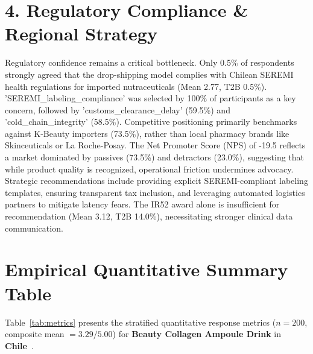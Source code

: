 \documentclass[10pt,twocolumn,a4paper]{article}
\begin{document}
\section{4. Regulatory Compliance \& Regional Strategy}
Regulatory confidence remains a critical bottleneck. Only 0.5\% of respondents strongly agreed that the drop-shipping model complies with Chilean SEREMI health regulations for imported nutraceuticals (Mean 2.77, T2B 0.5\%). 'SEREMI\_labeling\_compliance' was selected by 100\% of participants as a key concern, followed by 'customs\_clearance\_delay' (59.5\%) and 'cold\_chain\_integrity' (58.5\%). Competitive positioning primarily benchmarks against K-Beauty importers (73.5\%), rather than local pharmacy brands like Skinceuticals or La Roche-Posay. The Net Promoter Score (NPS) of -19.5 reflects a market dominated by passives (73.5\%) and detractors (23.0\%), suggesting that while product quality is recognized, operational friction undermines advocacy. Strategic recommendations include providing explicit SEREMI-compliant labeling templates, ensuring transparent tax inclusion, and leveraging automated logistics partners to mitigate latency fears. The IR52 award alone is insufficient for recommendation (Mean 3.12, T2B 14.0\%), necessitating stronger clinical data communication.


\section{Empirical Quantitative Summary Table}
Table~\ref{tab:metrics} presents the stratified quantitative response metrics ($n = 200$, composite mean $= 3.29/5.00$) for \textbf{Beauty Collagen Ampoule Drink} in \textbf{Chile}~\cite{ref_official_doi}.
\end{document}
